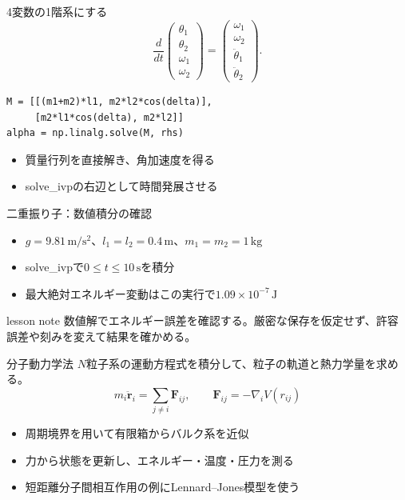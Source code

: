 \documentclass[12pt,aspectratio=43]{beamer}
\newenvironment{lessonbox}
  {\begin{beamercolorbox}[wd=\linewidth,sep=1.5mm]{lesson note}}
  {\end{beamercolorbox}\par}
\begin{document}
\begin{frame}[t,fragile]{4変数の1階系にする}
  \[
    \frac{d}{dt}
    \begin{pmatrix}\theta_1\\\theta_2\\\omega_1\\\omega_2\end{pmatrix}
    =
    \begin{pmatrix}\omega_1\\\omega_2\\\ddot\theta_1\\\ddot\theta_2\end{pmatrix}.
  \]
  \begin{lstlisting}
M = [[(m1+m2)*l1, m2*l2*cos(delta)],
     [m2*l1*cos(delta), m2*l2]]
alpha = np.linalg.solve(M, rhs)
  \end{lstlisting}
  \begin{itemize}
    \setlength{\itemsep}{1mm}
    \item 質量行列を直接解き、角加速度を得る
    \item solve\_ivpの右辺として時間発展させる
  \end{itemize}
\end{frame}

\begin{frame}[t]{二重振り子：数値積分の確認}
  \begin{itemize}
    \setlength{\itemsep}{1.5mm}
    \item $g=9.81\,\mathrm{m/s^2}$、$l_1=l_2=0.4\,\mathrm{m}$、$m_1=m_2=1\,\mathrm{kg}$
    \item solve\_ivpで$0\le t\le10\,\mathrm{s}$を積分
    \item 最大絶対エネルギー変動はこの実行で$1.09\times10^{-7}\,\mathrm{J}$
  \end{itemize}
  \begin{lessonbox}
    数値解でエネルギー誤差を確認する。厳密な保存を仮定せず、許容誤差や刻みを変えて結果を確かめる。
  \end{lessonbox}
\end{frame}

\begin{frame}[t]{分子動力学法}
  $N$粒子系の運動方程式を積分して、粒子の軌道と熱力学量を求める。
  \[
    m_i\ddot{\mathbf r}_i
      =\sum_{j\ne i}\mathbf F_{ij},
    \qquad
    \mathbf F_{ij}=-\nabla_i V(r_{ij})
  \]
  \begin{itemize}
    \setlength{\itemsep}{1.5mm}
    \item 周期境界を用いて有限箱からバルク系を近似
    \item 力から状態を更新し、エネルギー・温度・圧力を測る
    \item 短距離分子間相互作用の例にLennard--Jones模型を使う
  \end{itemize}
\end{frame}
\end{document}
